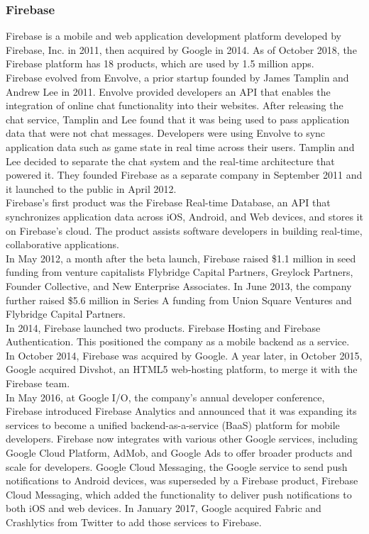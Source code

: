 \documentclass[14pt]{report}
\begin{document}
				\subsubsection{Firebase}
					Firebase is a mobile and web application development platform developed by Firebase, Inc. in 2011, then acquired by Google in 2014. As of October 2018, the Firebase platform has 18 products, which are used by 1.5 million apps.\\
				
					Firebase evolved from Envolve, a prior startup founded by James Tamplin and Andrew Lee in 2011. Envolve provided developers an API that enables the integration of online chat functionality into their websites. After releasing the chat service, Tamplin and Lee found that it was being used to pass application data that were not chat messages. Developers were using Envolve to sync application data such as game state in real time across their users. Tamplin and Lee decided to separate the chat system and the real-time architecture that powered it. They founded Firebase as a separate company in September 2011 and it launched to the public in April 2012.\\

					Firebase's first product was the Firebase Real-time Database, an API that synchronizes application data across iOS, Android, and Web devices, and stores it on Firebase's cloud. The product assists software developers in building real-time, collaborative applications.\\

					In May 2012, a month after the beta launch, Firebase raised \$1.1 million in seed funding from venture capitalists Flybridge Capital Partners, Greylock Partners, Founder Collective, and New Enterprise Associates. In June 2013, the company further raised \$5.6 million in Series A funding from Union Square Ventures and Flybridge Capital Partners.\\

					In 2014, Firebase launched two products. Firebase Hosting and Firebase Authentication. This positioned the company as a mobile backend as a service.\\

					In October 2014, Firebase was acquired by Google. A year later, in October 2015, Google acquired Divshot, an HTML5 web-hosting platform, to merge it with the Firebase team.\\

					In May 2016, at Google I/O, the company's annual developer conference, Firebase introduced Firebase Analytics and announced that it was expanding its services to become a unified backend-as-a-service (BaaS) platform for mobile developers. Firebase now integrates with various other Google services, including Google Cloud Platform, AdMob, and Google Ads to offer broader products and scale for developers. Google Cloud Messaging, the Google service to send push notifications to Android devices, was superseded by a Firebase product, Firebase Cloud Messaging, which added the functionality to deliver push notifications to both iOS and web devices. In January 2017, Google acquired Fabric and Crashlytics from Twitter to add those services to Firebase.\\
\end{document}
